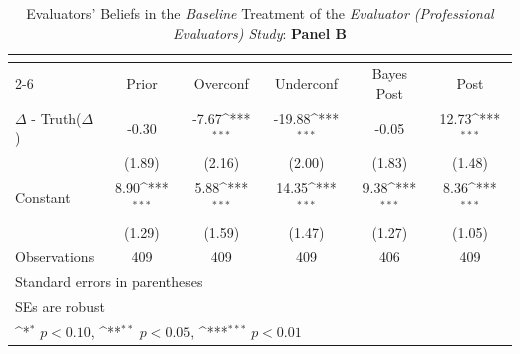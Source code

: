 \begin{table}[htbp]\centering
\def\sym#1{\ifmmode^{#1}\else\(^{#1}\)\fi}
\caption{Evaluators' Beliefs in the \textit{Baseline} Treatment of the \textit{Evaluator (Professional Evaluators) Study}: \textbf{Panel B}}
\begin{tabular}{l*{5}{c}}
\hline\hline
                &\multicolumn{5}{c}{}                                                                          \\\cmidrule(lr){2-6}
                &\multicolumn{1}{c}{Prior}&\multicolumn{1}{c}{Overconf}&\multicolumn{1}{c}{Underconf}&\multicolumn{1}{c}{Bayes Post}&\multicolumn{1}{c}{Post}\\
\hline
$\Delta$ - Truth($\Delta$)&    -0.30         &    -7.67\sym{***}&   -19.88\sym{***}&    -0.05         &    12.73\sym{***}\\
                &   (1.89)         &   (2.16)         &   (2.00)         &   (1.83)         &   (1.48)         \\
Constant        &     8.90\sym{***}&     5.88\sym{***}&    14.35\sym{***}&     9.38\sym{***}&     8.36\sym{***}\\
                &   (1.29)         &   (1.59)         &   (1.47)         &   (1.27)         &   (1.05)         \\
\hline
Observations    &      409         &      409         &      409         &      406         &      409         \\
\hline\hline
\multicolumn{6}{l}{\footnotesize Standard errors in parentheses}\\
\multicolumn{6}{l}{\footnotesize SEs are robust}\\
\multicolumn{6}{l}{\footnotesize \sym{*} \(p<0.10\), \sym{**} \(p<0.05\), \sym{***} \(p<0.01\)}\\
\end{tabular}
\end{table}
